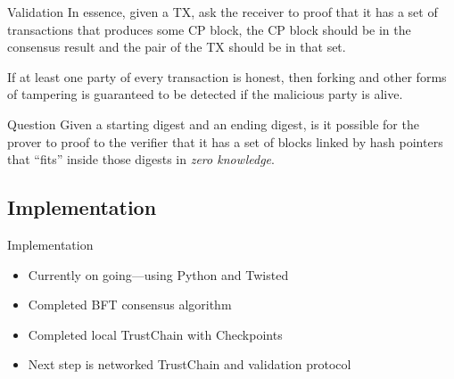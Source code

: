 \documentclass{beamer}
\begin{document}
\begin{frame}{Validation}
  In essence, given a TX, ask the receiver to proof that it has a set of
  transactions that produces some CP block, the CP block should be in the
  consensus result and the pair of the TX should be in that set.

  \begin{theorem}
    If at least one party of every transaction is honest, then forking and other
    forms of tampering is guaranteed to be detected if the malicious party is
    alive.
  \end{theorem}

  \begin{block}{Question}
    Given a starting digest and an ending digest, is it possible for the prover
    to proof to the verifier that it has a set of blocks linked by hash pointers
    that ``fits'' inside those digests in \emph{zero knowledge}.
  \end{block}
\end{frame}

\subsection{Implementation}
\begin{frame}{Implementation}
  \begin{itemize}
    \item Currently on going---using Python and Twisted
    \item Completed BFT consensus algorithm
    \item Completed local TrustChain with Checkpoints
    \item Next step is networked TrustChain and validation protocol
  \end{itemize}
\end{frame}
\end{document}
